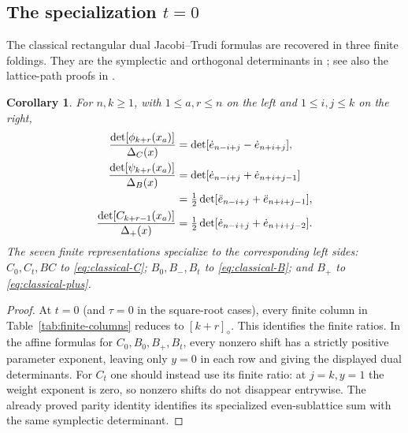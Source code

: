 \documentclass[12pt]{article}
\newtheorem{corollary}[theorem]{Corollary}
\numberwithin{equation}{section}
\newcommand{\dote}{\dot e}
\newcommand{\ddote}{\ddot e}
\newcommand{\ph}{\phi}
\newcommand{\ps}{\psi}
\begin{document}
\subsection{The specialization \texorpdfstring{$t=0$}{t=0}}

The classical rectangular dual Jacobi--Trudi formulas are recovered in
three finite foldings.  They are the symplectic and orthogonal
determinants in \cite[Theorem~2.1]{AlbionEtAl2024}; see also the
lattice-path proofs in \cite{FulmekKrattenthaler1997}.

\begin{corollary}
For $n,k\ge1$, with $1\le a,r\le n$ on the left and
$1\le i,j\le k$ on the right,
\begin{align}
 \frac{\det[\ph_{k+r}(x_a)]}{\Delta_C(x)}
 &=\det[\dote_{n-i+j}-\dote_{n+i+j}],\label{eq:classical-C}\\
 \frac{\det[\ps_{k+r}(x_a)]}{\Delta_B(x)}
 &=\det[\dote_{n-i+j}+\dote_{n+i+j-1}]\notag\\
 &=\tfrac12\det[\ddote_{n-i+j}+\ddote_{n+i+j-1}],
 \label{eq:classical-B}\\
 \frac{\det[C_{k+r-1}(x_a)]}{\Delta_+(x)}
 &=\tfrac12\det[\dote_{n-i+j}+\dote_{n+i+j-2}].
 \label{eq:classical-plus}
\end{align}
The seven finite representations specialize to the corresponding left
sides: $C_0,C_t,BC$ to \eqref{eq:classical-C};
$B_0,B_-,B_t$ to \eqref{eq:classical-B}; and $B_+$ to
\eqref{eq:classical-plus}.
\end{corollary}

\begin{proof}
At $t=0$ (and $\tau=0$ in the square-root cases), every finite
column in Table~\ref{tab:finite-columns} reduces to
$[k+r]_\diamond$.  This identifies the finite ratios.
In the affine formulas for $C_0,B_0,B_+,B_t$, every nonzero shift
has a strictly positive parameter exponent, leaving only $y=0$ in
each row and giving the displayed dual determinants.
For $C_t$ one should instead use its finite ratio: at $j=k,y=1$
the weight exponent is zero, so nonzero shifts do not disappear
entrywise.  The already proved parity identity identifies its
specialized even-sublattice sum with the same symplectic determinant.
\end{proof}
\end{document}
